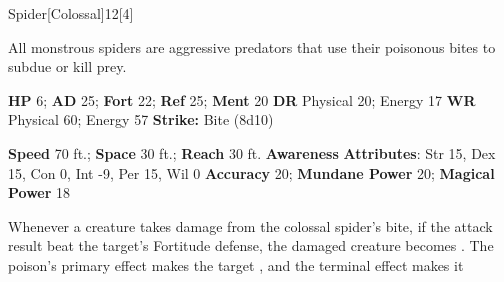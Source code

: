   
  \begin{monsection}{Spider}[Colossal]{12}[4]
    \vspace{-1em}\vspace{-1em}
    \vspace{0em}

    
    All monstrous spiders are aggressive predators that use their poisonous bites to subdue or kill prey.
  

    \begin{spellcontent}
      \begin{spelltargetinginfo}
        \pari \textbf{HP} 6;
          \textbf{AD} 25;
          \textbf{Fort} 22;
          \textbf{Ref} 25;
          \textbf{Ment} 20
        \pari \textbf{DR} Physical 20; Energy 17
        \pari \textbf{WR} Physical 60; Energy 57
        \pari \textbf{Strike:}
            Bite  (8d10)
      \end{spelltargetinginfo}
    \end{spellcontent}
    \begin{monsterfooter}
      \pari \textbf{Speed} 70 ft.;
        \textbf{Space} 30 ft.;
        \textbf{Reach} 30 ft.
      \pari \textbf{Awareness} 
      \pari \textbf{Attributes}:
        Str 15, Dex 15,
        Con 0, Int -9,
        Per 15, Wil 0
      \pari \textbf{Accuracy} 20;
        \textbf{Mundane Power} 20;
      \textbf{Magical Power} 18
    \end{monsterfooter}
  \end{monsection}
    Whenever a creature takes damage from the colossal spider's bite,
      if the attack result beat the target's Fortitude defense,
      the damaged creature becomes .
    The poison's primary effect makes the target , and the terminal effect makes it 
  
